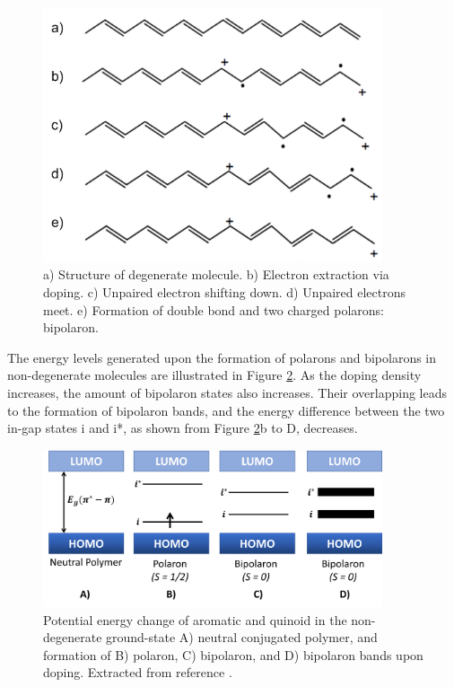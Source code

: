 \begin{figure}[ht]
  \centering
  \includegraphics[width=10cm]{Images/pdf/bipolaron.pdf}
  \caption[Representation of bipolaron formation introduced via doping]{a) Structure of degenerate molecule. b) Electron extraction via doping. c) Unpaired electron shifting down. d) Unpaired electrons meet. e) Formation of double bond and two charged polarons: bipolaron.}
  \label{fig:bipol}
\end{figure}

The energy levels generated upon the formation of polarons and bipolarons in non-degenerate molecules are illustrated in Figure \ref{fig:ebipol}. As the doping density increases, the amount of bipolaron states also increases. Their overlapping leads to the formation of bipolaron bands, and the energy difference between the two in-gap states i and i*, as shown from Figure \ref{fig:ebipol}b to D, decreases. %

\begin{figure}[ht]
  \centering
  \includegraphics[width=10cm]{Images/pdf/bipolaron_bands.pdf}
  \caption[Formation of polaron, bipolaron, and bipolaron band]{Potential energy change of aromatic and quinoid in the non-degenerate ground-state A) neutral conjugated polymer, and formation of B) polaron, C) bipolaron, and D) bipolaron bands upon doping. Extracted from reference \cite{heydarigharahcheshmehTextureNanostructuralEngineering2020}.}
  \label{fig:ebipol}
\end{figure}


